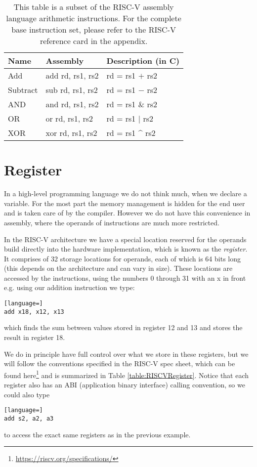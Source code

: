     \begin{table}[h!]
        \centering
        \begin{tabular}{|l|l|l|}
        	\hline
        	Name     & Assembly         & Description (in C) \\ \hline
        	Add      & add rd, rs1, rs2 & rd = rs1 $+$ rs2   \\
        	Subtract & sub rd, rs1, rs2 & rd = rs1 $-$ rs2   \\
        	AND      & and rd, rs1, rs2 & rd = rs1 \& rs2    \\
        	OR       & or rd, rs1, rs2  & rd = rs1 $|$ rs2   \\
        	XOR      & xor rd, rs1, rs2 & rd = rs1 \^{} rs2  \\ \hline
        \end{tabular}
        \caption{This table is a subset of the RISC-V assembly language arithmetic instructions. For the complete base instruction set, please refer to the RISC-V reference card in the appendix.}
        \label{table:RISCVInstructions}
    \end{table}

\section{Register}\label{section:Register}
    In a high-level programming language we do not think much, when we declare a variable. For the most part the memory management is hidden for the end user and is taken care of by the compiler. However we do not have this convenience in assembly, where the operands of instructions are much more restricted. 
    
    In the RISC-V architecture we have a special location reserved for the operands build directly into the hardware implementation, which is known as the \textit{register}. It comprises of 32 storage locations for operands, each of which is 64 bits long (this depends on the architecture and can vary in size). These locations are accessed by the instructions, using the numbers 0 through 31 with an x in front e.g. using our addition instruction we type:
    \begin{lstlisting}[language=]
add x18, x12, x13
    \end{lstlisting}
     which finds the sum between values stored in register 12 and 13 and stores the result in register 18.
     
     We do in principle have full control over what we store in these registers, but we will follow the conventions specified in the RISC-V spec sheet, which can be found here\footnote{\url{https://riscv.org/specifications/}} and is summarized in Table \ref{table:RISCVRegister}. Notice that each register also has an ABI (application binary interface) calling convention, so we could also type
     \begin{lstlisting}[language=]
add s2, a2, a3
     \end{lstlisting}
     to access the exact same registers as in the previous example.
     
